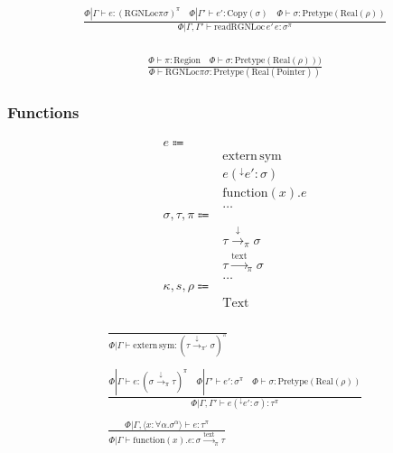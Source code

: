 \documentclass {article}
\begin{document}
\begin{gather*}
\frac
{\Phi | \Gamma \vdash e : (\text{RGNLoc} \pi \sigma)^\pi \quad \Phi | \Gamma' \vdash e' : \text{Copy} (\sigma) \quad \Phi \vdash \sigma : \text{Pretype}(\text{Real}(\rho)) }
{\Phi | \Gamma, \Gamma' \vdash \text{readRGNLoc} \, e' \, e : \sigma^\pi} \\
\end{gather*}

\begin{gather*}
\frac
{\Phi \vdash \pi : \text{Region} \quad \Phi \vdash \sigma : \text{Pretype}(\text{Real}(\rho)))}
{\Phi \vdash \text{RGNLoc} \pi \sigma : \text{Pretype} (\text{Real}(\text{Pointer}))}
\end{gather*}

\subsubsection{Functions}

\begin{align*}
e \Coloneqq & \\
& \text{extern} \, \text{sym} \tag{Extern Function} \\
& e(^\downarrow e' : \sigma) \tag{Function Pointer Application} \\
& \text{function} (x). e \tag{Function Literal} \\
& \dots \\
\sigma, \tau, \pi \Coloneqq & \\
& \tau \xrightarrow{\downarrow}_\pi \sigma \tag{Function Pointer}\\
& \tau \xrightarrow{\text{text}}_\pi \sigma  \tag{Function Literal Type} \\
& \dots \\
\kappa, s, \rho \Coloneqq & \\
& \text{Text} \tag{Symbol Stage} \\
\end{align*}

\begin{gather*}
\frac
{}
{\Phi | \Gamma \vdash \text{extern} \, \text{sym} : (\tau \xrightarrow{\downarrow}_{\pi'} \sigma)^\pi} \\
\\
\frac
{\Phi | \Gamma \vdash e : (\sigma \xrightarrow{\downarrow}_\pi \tau)^\pi \quad \Phi | \Gamma' \vdash e' : \sigma^\pi \quad \Phi \vdash \sigma : \text{Pretype}(\text{Real}(\rho))}
{\Phi | \Gamma, \Gamma' \vdash e(^\downarrow e' : \sigma) : \tau^\pi} \\
\\
\frac
{\Phi | \Gamma, \langle x : \forall \alpha. \sigma^\alpha \rangle \vdash e : \tau^\pi}
{\Phi | \Gamma \vdash \text{function}(x). e : \sigma \xrightarrow{\text{text}}_\pi \tau} \\
\end{gather*}
\end{document}
